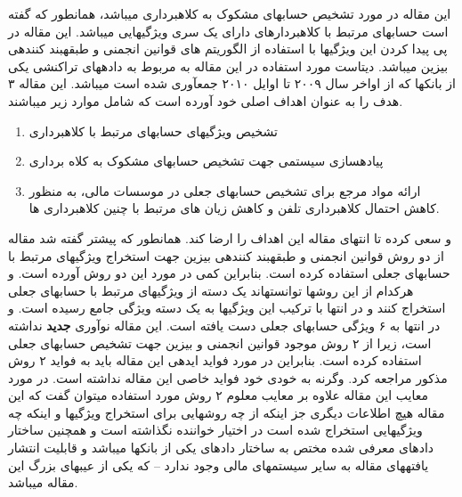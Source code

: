 \documentclass[10pt,a4paper]{article}
\newcommand{\نیمفاصله}{\halfspace}
\renewcommand{\ }{\halfspace}
\begin{document}
این مقاله در مورد تشخیص حساب\ های مشکوک به کلاه\ برداری می\ باشد، همانطور که گفته است حساب\ های مرتبط با کلاه\ بردارهای دارای یک سری ویژگی\ هایی می\ باشد. این مقاله در پی پیدا کردن این ویژگی\ ها با استفاده از الگوریتم های قوانین انجمنی و طبقه\ بند کننده\ ی بیزین می\ باشد. دیتاست مورد استفاده در این مقاله به مربوط به داده\ های تراکنشی یکی از بانک\ ها که از اواخر سال ۲۰۰۹ تا اوایل ۲۰۱۰ جمع\ آوری شده است می\ باشد. این مقاله ۳ هدف را به عنوان اهداف اصلی خود آورده است که شامل موارد زیر می\ باشند.
\begin{enumerate}
    \itemsep-1em 
    \item تشخیص ویژگی\ های حساب\ های مرتبط با کلاه\ برداری
    \item پیاده\ سازی سیستمی جهت تشخیص حساب\ های مشکوک به کلاه برداری
    \item ارائه مواد مرجع برای تشخیص حساب\ های جعلی در موسسات مالی، به منظور کاهش احتمال کلاه\ برداری تلفن  و کاهش زیان های مرتبط با چنین کلاه\ برداری ها.
\end{enumerate}
و سعی کرده تا انتهای مقاله این اهداف را ارضا کند.
همانطور که پیشتر گفته شد مقاله از دو روش قوانین انجمنی و طبقه\ بند کننده\ ی بیزین جهت استخراج ویژگی\ های مرتبط با حساب\ های جعلی استفاده کرده است. بنابراین کمی در مورد این دو روش آورده است. و هرکدام از این روش\ ها توانسته\ اند یک دسته از ویژگی\ های مرتبط با حساب\ های جعلی استخراج کنند و در انتها با ترکیب این ویژگی\ ها به یک دسته ویژگی جامع رسیده است. و در انتها به ۶ ويژگی حساب\ های جعلی دست یافته است.
این مقاله نوآوری \textbf{جدید} نداشته است، زیرا از ۲ روش موجود قوانین انجمنی و بیزین جهت تشخیص حساب\ های جعلی استفاده کرده است. بنابراین در مورد فواید ایده\ ی این مقاله باید به فواید ۲ روش مذکور مراجعه کرد. وگرنه به خودی خود فواید خاصی این مقاله نداشته است.
در مورد معایب این مقاله علاوه بر معایب معلوم ۲ روش مورد استفاده می\ توان گفت که این مقاله هیچ اطلاعات دیگری جز اینکه از چه روش\ هایی برای استخراج ویژگی\ ها و اینکه چه ویژگی\ هایی استخراج شده است در اختیار خواننده نگذاشته است و همچنین ساختار داده\ ای معرفی شده مختص به ساختار داده\ ای یکی از بانک\ ها می\ باشد و قابلیت انتشار یافته\ های مقاله به سایر سیستم\ های مالی وجود ندارد -- که یکی از عیب\ های بزرگ این مقاله می\ باشد.
\end{document}
